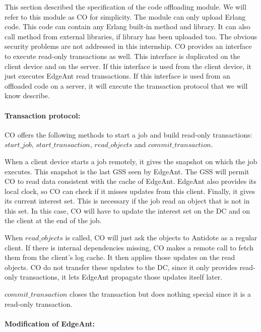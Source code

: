 \documentclass[11pt]{article}
\begin{document}
This section described the specification of the code offloading module. We
will refer to this module as CO for simplicity. The module can only upload
Erlang code. This code can contain any Erlang built-in method and library. It
can also call method from external libraries, if library has been uploaded
too. The obvious security problems are not addressed in this internship. CO
provides an interface to execute read-only transactions as well. This
interface is duplicated on the client device and on the server. If this
interface is used from the client device, it just executes EdgeAnt read
transactions. If this interface is used from an offloaded code on a server, it
will execute the transaction protocol that we will know describe.

\paragraph{Transaction protocol:}

CO offers the following methods to start a job and build read-only
transactions: $start\_job$, $start\_transaction$, $read\_objects$ and
$commit\_transaction$.

When a client device starts a job remotely, it gives the snapshot on which the
job executes. This snapshot is the last GSS seen by EdgeAnt. The GSS will
permit CO to read data consistent with the cache of EdgeAnt. EdgeAnt also
provides its local clock, so CO can check if it misses updates from this
client. Finally, it gives its current interest set. This is necessary if the
job read an object that is not in this set. In this case, CO will have to
update the interest set on the DC and on the client at the end of the job. 

When $read\_objects$ is called, CO will just ask the objects to Antidote as a
regular client. If there is internal dependencies missing, CO makes a remote
call to fetch them from the client's log cache. It then applies those updates
on the read objects. CO do not transfer these updates to the DC, since it only
provides read-only transactions, it lets EdgeAnt propagate those updates
itself later.

$commit\_transaction$ closes the transaction but does nothing
special since it is a read-only transaction.

\paragraph{Modification of EdgeAnt:}
\end{document}
